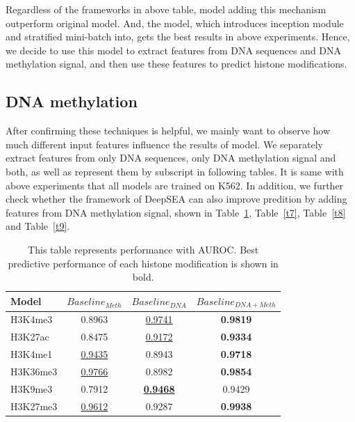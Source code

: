 Regardless of the frameworks in above table, model adding this mechanism outperform original model. And, the model, which introduces inception module and stratified mini-batch into, gets the best results in above experiments. Hence, we decide to use this model to extract features from DNA sequences and DNA methylation signal, and then use these features to predict histone modifications.

\subsection{DNA methylation}
After confirming these techniques is helpful, we mainly want to observe how much different input features influence the results of model. We separately extract features from only DNA sequences, only DNA methylation signal and both, as well as represent them by subscript in following tables. It is same with above experiments that all models are trained on K562. In addition, we further check whether the framework of DeepSEA can also improve predition by adding features from DNA methylation signal, shown in Table~\ref{t6}, Table~\ref{t7}, Table~\ref{t8} and Table~\ref{t9}.

\begin{table}[H]%
    \centering
    \begin{tabular}{lccc}
    \hline
    Model & $Baseline_{Meth}$ & $Baseline_{DNA}$ & $Baseline_{DNA+Meth}$ \\\hline
    H3K4me3 & 0.8963 & \underline{0.9741} & \textbf{0.9819} \\
    H3K27ac & 0.8475 & \underline{0.9172} & \textbf{0.9334} \\
    H3K4me1 & \underline{0.9435} & 0.8943 & \textbf{0.9718} \\
    H3K36me3 & \underline{0.9766} & 0.8982 & \textbf{0.9854} \\
    H3K9me3 & 0.7912 & \textbf{\underline{0.9468}} & 0.9429 \\
    H3K27me3 & \underline{0.9612} & 0.9287 & \textbf{0.9938} \\\hline
    \end{tabular}
    \captionsetup{labelfont=bf}
    \renewcommand{\baselinestretch}{1.0}
    \caption[Comparison of different inputs of baseline with AUROC]{This table represents performance with AUROC. Best predictive performance of each histone modification is shown in bold.}
    \label{t6}
\end{table}

